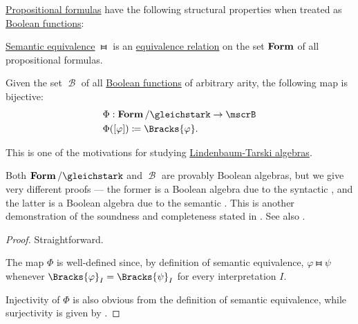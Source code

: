 \begin{proposition}\label{thm:propositional_formulas_and_boolean_functions}
  \hyperref[def:propositional_grammar_schema/formula]{Propositional formulas} have the following structural properties when treated as \hyperref[def:boolean_function]{Boolean functions}:

  \begin{thmenum}
     \hyperref[def:propositional_entailment/equivalence]{Semantic equivalence} \( \gleichstark \) is an \hyperref[def:equivalence_relation]{equivalence relation} on the set \( \operatorname{\mathbf{Form}} \) of all propositional formulas.

     Given the set \( \mscrB \) of all \hyperref[def:boolean_function]{Boolean functions} of arbitrary arity, the following map is bijective:
    \begin{equation*}
      \begin{aligned}
        &\Phi: \boldop{Form} / {\gleichstark} \to \mscrB \\
        &\Phi([\varphi]) \coloneqq \Bracks{\varphi}.
      \end{aligned}
    \end{equation*}
  \end{thmenum}
\end{proposition}
\begin{comments}
  \item This is one of the motivations for studying \hyperref[def:lindenbaum_tarski_algebra]{Lindenbaum-Tarski algebras}.
  \item Both \( \boldop{Form} / {\gleichstark} \) and \( \mscrB \) are provably Boolean algebras, but we give very different proofs --- the former is a Boolean algebra due to the syntactic , and the latter is a Boolean algebra due to the semantic . This is another demonstration of the soundness and completeness stated in . See also .
\end{comments}
\begin{proof}
   Straightforward.

   The map \( \Phi \) is well-defined since, by definition of semantic equivalence, \( \varphi \gleichstark \psi \) whenever \( \Bracks{\varphi}_I = \Bracks{\psi}_I \) for every interpretation \( I \).

  Injectivity of \( \Phi \) is also obvious from the definition of semantic equivalence, while surjectivity is given by .
\end{proof}
